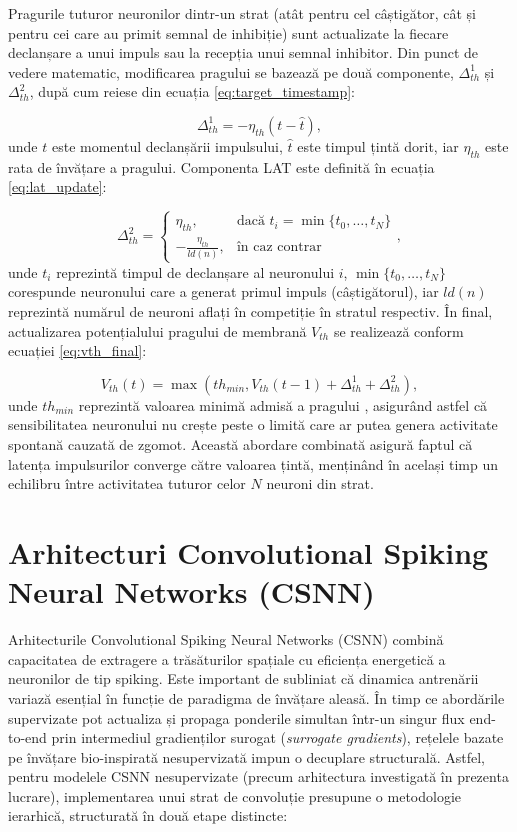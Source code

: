 Pragurile tuturor neuronilor dintr-un strat (atât pentru cel câștigător, cât și pentru cei care au primit semnal de inhibiție) sunt actualizate la fiecare declanșare a unui impuls sau la recepția unui semnal inhibitor. Din punct de vedere matematic, modificarea pragului se bazează pe două componente, $\Delta_{th}^1$ și $\Delta_{th}^2$, după cum reiese din ecuația \eqref{eq:target_timestamp}:

\begin{equation}
\label{eq:target_timestamp}
\Delta_{th}^1 = -\eta_{th}(t - \hat{t}),
\end{equation}
unde $t$ este momentul declanșării impulsului, $\hat{t}$ este timpul țintă dorit, iar $\eta_{th}$ este rata de învățare a pragului. 
Componenta LAT este definită în ecuația \eqref{eq:lat_update}:

\begin{equation}
\label{eq:lat_update}
\Delta_{th}^2 = 
\begin{cases} 
\eta_{th}, & \text{dacă } t_i = \min\{t_0, \dots, t_N\} \\
-\frac{\eta_{th}}{ld(n)}, & \text{în caz contrar}
\end{cases},
\end{equation}
unde $t_i$ reprezintă timpul de declanșare al neuronului $i$, $\min\{t_0, \dots, t_N\}$ corespunde neuronului care a generat primul impuls (câștigătorul), iar $ld(n)$ reprezintă numărul de neuroni aflați în competiție în stratul respectiv. În final, actualizarea potențialului pragului de membrană $V_{th}$ se realizează conform ecuației \eqref{eq:vth_final}:

\begin{equation}
\label{eq:vth_final}
V_{th}(t) = \max(th_{min}, V_{th}(t-1) + \Delta_{th}^1 + \Delta_{th}^2),
\end{equation}
unde $th_{min}$ reprezintă valoarea minimă admisă a pragului \cite{falez2019}, asigurând astfel că sensibilitatea neuronului nu crește peste o limită care ar putea genera activitate spontană cauzată de zgomot. Această abordare combinată asigură faptul că latența impulsurilor converge către valoarea țintă, menținând în același timp un echilibru între activitatea tuturor celor $N$ neuroni din strat.

\section{Arhitecturi Convolutional Spiking Neural Networks (CSNN)}

Arhitecturile Convolutional Spiking Neural Networks (CSNN) combină capacitatea de extragere a trăsăturilor spațiale cu eficiența energetică a neuronilor de tip spiking. Este important de subliniat că dinamica antrenării variază esențial în funcție de paradigma de învățare aleasă. În timp ce abordările supervizate pot actualiza și propaga ponderile simultan într-un singur flux end-to-end prin intermediul gradienților surogat (\textit{surrogate gradients}), rețelele bazate pe învățare bio-inspirată nesupervizată impun o decuplare structurală. Astfel, pentru modelele CSNN nesupervizate (precum arhitectura investigată în prezenta lucrare), implementarea unui strat de con\-vo\-lu\-ți\-e presupune o metodologie ierarhică, structurată în două etape distincte:

